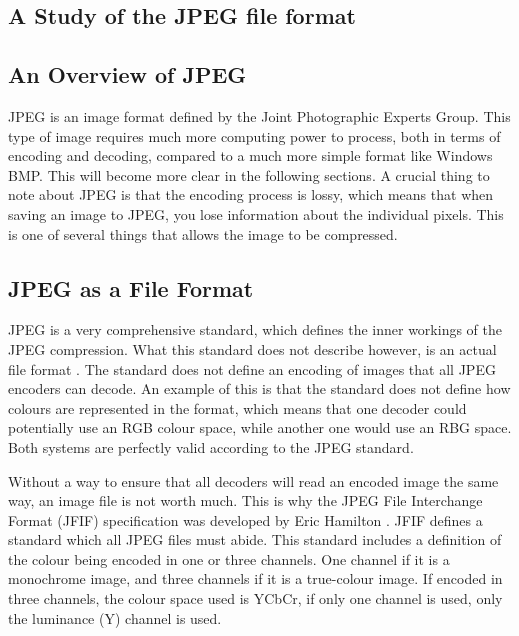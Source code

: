 \begin{infobox}{\section[A Study of the JPEG File Format]{A Study of the JPEG file format}\label{sec:jpegStudy}}

\subsection{An Overview of JPEG}
\vspace{-2.5mm}
JPEG is an image format defined by the Joint Photographic Experts Group. 
This type of image requires much more computing power to process, both in terms of encoding and decoding, compared to a much more simple format like Windows BMP.
This will become more clear in the following sections. 
A crucial thing to note about JPEG is that the encoding process is lossy, which means that when saving an image to JPEG, you lose information about the individual pixels.
This is one of several things that allows the image to be compressed.

\vspace{4mm}
\subsection{JPEG as a File Format}
\vspace{-2.5mm}
JPEG is a very comprehensive standard, which defines the inner workings of the JPEG compression. 
What this standard does not describe however, is an actual file format \citep{Miano1999}. 
The standard does not define an encoding of images that all JPEG encoders can decode.
An example of this is that the standard does not define how colours are represented in the format, which means that one decoder could potentially use an RGB colour space, while another one would use an RBG space.
Both systems are perfectly valid according to the JPEG standard.

Without a way to ensure that all decoders will read an encoded image the same way, an image file is not worth much.
This is why the JPEG File Interchange Format (JFIF) specification was developed by Eric Hamilton \citep{jfifspecs}.
JFIF defines a standard which all JPEG files must abide.
This standard includes a definition of the colour being encoded in one or three channels.
One channel if it is a monochrome image, and three channels if it is a true-colour image.
If encoded in three channels, the colour space used is YCbCr, if only one channel is used, only the luminance (Y) channel is used.


\end{infobox}
